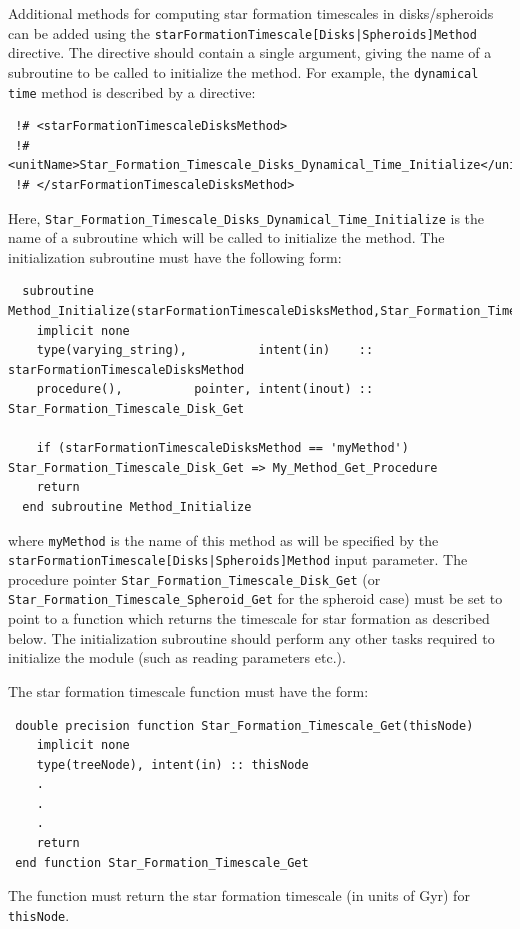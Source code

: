Additional methods for computing star formation timescales in disks/spheroids can be added using the {\tt starFormationTimescale[Disks|Spheroids]Method} directive. The directive should contain a single argument, giving the name of a subroutine to be called to initialize the method. For example, the {\tt dynamical time} method is described by a directive:
\begin{verbatim}
 !# <starFormationTimescaleDisksMethod>
 !#  <unitName>Star_Formation_Timescale_Disks_Dynamical_Time_Initialize</unitName>
 !# </starFormationTimescaleDisksMethod>
\end{verbatim}
Here, {\tt Star\_Formation\_Timescale\_Disks\_Dynamical\_Time\_Initialize} is the name of a subroutine which will be called to initialize the method. The initialization subroutine must have the following form:
\begin{verbatim}
  subroutine Method_Initialize(starFormationTimescaleDisksMethod,Star_Formation_Timescale_Disk_Get)
    implicit none
    type(varying_string),          intent(in)    :: starFormationTimescaleDisksMethod
    procedure(),          pointer, intent(inout) :: Star_Formation_Timescale_Disk_Get
    
    if (starFormationTimescaleDisksMethod == 'myMethod') Star_Formation_Timescale_Disk_Get => My_Method_Get_Procedure
    return
  end subroutine Method_Initialize
\end{verbatim}
where {\tt myMethod} is the name of this method as will be specified by the {\tt starFormationTimescale[Disks|Spheroids]Method} input parameter. The procedure pointer {\tt Star\_Formation\_Timescale\_Disk\_Get} (or {\tt Star\_Formation\_Timescale\_Spheroid\_Get} for the spheroid case) must be set to point to a function which returns the timescale for star formation as described below. The initialization subroutine should perform any other tasks required to initialize the module (such as reading parameters etc.).

The star formation timescale function must have the form:
\begin{verbatim}
 double precision function Star_Formation_Timescale_Get(thisNode)
    implicit none
    type(treeNode), intent(in) :: thisNode
    .
    .
    .
    return
 end function Star_Formation_Timescale_Get
\end{verbatim}
The function must return the star formation timescale (in units of Gyr) for {\tt thisNode}.

